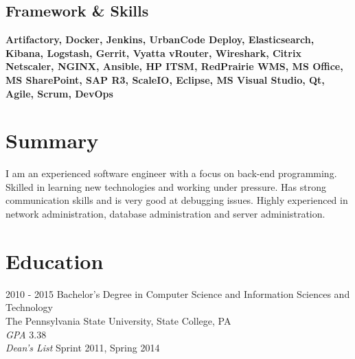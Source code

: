 \documentclass[]{friggeri-cv}
\begin{document}
\begin{aside}
  \section{Framework & Skills}
    \textbf{Artifactory, Docker, Jenkins, UrbanCode Deploy, Elasticsearch, Kibana, Logstash,
    Gerrit, Vyatta vRouter, Wireshark, Citrix Netscaler, NGINX, Ansible, HP ITSM, RedPrairie WMS,
    MS Office, MS SharePoint, SAP R3, ScaleIO, Eclipse, MS Visual Studio, Qt, Agile, Scrum, DevOps}
\end{aside}

\section{Summary}
  {I am an experienced software engineer with a focus on back-end programming. Skilled in learning new
  technologies and working under pressure. Has strong communication skills and is very good at
  debugging issues. Highly experienced in network administration, database administration and server
  administration.\\}

\section{Education}
\begin{entrylist}
  \entry
    {2010 - 2015}
    {Bachelor's Degree in Computer Science and Information Sciences and Technology}
    {\\The Pennsylvania State University, State College, PA\\}
    {\emph{GPA} 3.38\\
    \emph{Dean's List} Sprint 2011, Spring 2014\\}

\end{entrylist}
\end{document}
